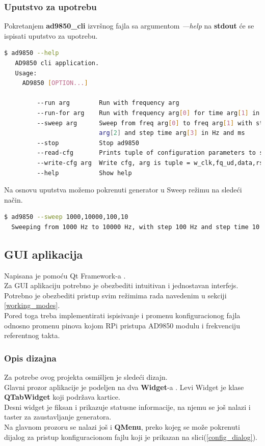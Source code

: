 \subsubsection{Uputstvo za upotrebu}

Pokretanjem \textbf{ad9850\_cli} izvršnog fajla sa argumentom \emph{---help} na
\textbf{stdout} će se ispisati uputstvo za upotrebu. \\

\begin{lstlisting}[language=bash, caption=ad9850\_cli help opcija]
   $ ad9850 --help
   AD9850 cli application.
   Usage:
     AD9850 [OPTION...]

         --run arg        Run with frequency arg
         --run-for arg    Run with frequency arg[0] for time arg[1] in ms
         --sweep arg      Sweep from freq arg[0] to freq arg[1] with step freq
                          arg[2] and step time arg[3] in Hz and ms
         --stop           Stop ad9850
         --read-cfg       Prints tuple of configuration parameters to stdout
         --write-cfg arg  Write cfg, arg is tuple = w_clk,fq_ud,data,rst,dds_clk
         --help           Show help

\end{lstlisting} %

Na osnovu uputstva možemo pokrenuti generator u Sweep režimu na sledeći način.

\begin{lstlisting}[language=bash, caption=ad9850\_cli sweep opcija]
  $ ad9850 --sweep 1000,10000,100,10
  Sweeping from 1000 Hz to 10000 Hz, with step 100 Hz and step time 10 ms
\end{lstlisting} %
\subsection{GUI aplikacija}

Napisana je pomoću Qt Framework-a \cite{qt}. \\
Za GUI aplikaciju potrebno je obezbediti intuitivan i jednostavan interfejs.
Potrebno je obezbediti pristup svim režimima rada navedenim u sekciji
\ref{working_modes}. \\
Pored toga treba implementirati ispisivanje i promenu konfiguracionog fajla odnosno
promenu pinova kojom RPi pristupa AD9850 modulu i frekvenciju referentnog takta.

\subsubsection{Opis dizajna}
Za potrebe ovog projekta osmišljen je sledeći dizajn. \\
Glavni prozor aplikacije je podeljen na dva \textbf{Widget}-a \cite{QWidget}.
Levi Widget je klase \textbf{QTabWidget} koji podržava kartice. \\
Desni widget je fiksan i prikazuje statusne informacije, na njemu se još nalazi
i taster za zaustavljanje generatora. \\
Na glavnom prozoru se nalazi još i \textbf{QMenu}\cite{QMenu}, preko kojeg se
može pokrenuti dijalog za pristup konfiguracionom fajlu koji je prikazan na
slici(\ref{config_dialog}). \\

